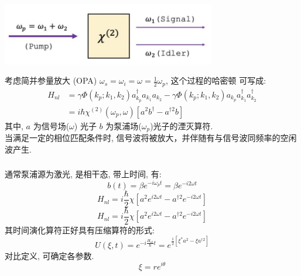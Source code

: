 \begin{frame}
 \frametitle{}
        \begin{center}
             \includegraphics[width=0.7\textwidth]{figs/2022-05-02-20-00-04.png}
        \end{center}
        考虑简并参量放大 (OPA) $\omega_s = \omega_i = \omega = \frac{1}{2} \omega_p$, 这个过程的哈密顿 可写成: 
    \[ 
        \begin{aligned}
            H_{nl} & = \gamma  \Phi\left(k_{p} ; k_{1}, k_{2}\right) a_{k_{p}} ^ \dagger  a_{k_{1}} a_{k_{2}} - \gamma  \Phi\left(k_{p} ; k_{1}, k_{2}\right) a_{k_{p}} a_{k_{1}}^{\dagger} a_{k_{2}}^{\dagger} \\ 
            &= i \hbar \chi ^{(2)} (\omega_p, \omega) [ a^2 b^\dagger -  a ^{\dagger 2} b ]
            \end{aligned} \]
    其中, $a$ 为信号场($\omega$) 光子 $b$ 为泵浦场($\omega_p$)光子的湮灭算符.  \\ 
    当满足一定的相位匹配条件时, 信号波将被放大，并伴随有与信号波同频率的空闲波产生. 
\end{frame}

\begin{frame}
 \frametitle{}
     通常泵浦源为激光, 是相干态, 带上时间, 有:
    \[ b(t) = \beta e ^{-i \omega_p t} = \beta e ^{-i 2 \omega t} \] 
     \[ H_{nl} = i \frac{\hbar}{2} \chi [ a^2 e ^{i 2 \omega t} -  a ^{\dagger 2} e ^{-i 2 \omega t}]  \]
     \[ H_{nl} = i \frac{\hbar}{2} \chi [ a^2 e ^{i 2 \omega t} -  a ^{\dagger 2} e ^{-i 2 \omega t}]  \]
     其时间演化算符正好具有压缩算符的形式: 
     \[U(\xi, t) = e^{- i \frac{H_{nl}}{\hbar} t}  =  e^{\frac{1}{2}[\xi^* a^2 - \xi a^{\dagger 2} ]} \]
    对比定义, 可确定各参数.
    \[ \xi = r e ^ {i \theta } \]
\end{frame}

